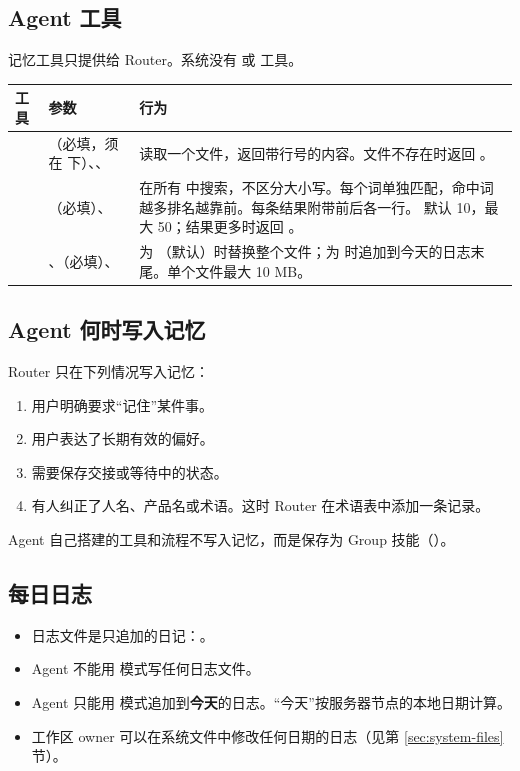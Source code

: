 \documentclass[UTF8,a4paper,11pt]{ctexart}
\begin{document}
\subsection{Agent 工具}

记忆工具只提供给 Router。系统没有  或  工具。

\begin{longtable}{P{3.0cm}P{4.2cm}P{6.6cm}}
\toprule
工具 & 参数 & 行为 \\
\midrule
\endhead
{} & （必填，须在  下）、、 & 读取一个文件，返回带行号的内容。文件不存在时返回 。 \\
 & （必填）、 & 在所有  中搜索，不区分大小写。每个词单独匹配，命中词越多排名越靠前。每条结果附带前后各一行。 默认 10，最大 50；结果更多时返回 。 \\
 & 、（必填）、 &  为 （默认）时替换整个文件；为  时追加到今天的日志末尾。单个文件最大 10 MB。 \\
\bottomrule
\end{longtable}

\subsection{Agent 何时写入记忆}

Router 只在下列情况写入记忆：

\begin{enumerate}
  \item 用户明确要求“记住”某件事。
  \item 用户表达了长期有效的偏好。
  \item 需要保存交接或等待中的状态。
  \item 有人纠正了人名、产品名或术语。这时 Router 在术语表中添加一条记录。
\end{enumerate}

Agent 自己搭建的工具和流程不写入记忆，而是保存为 Group 技能（）。

\subsection{每日日志}

\begin{itemize}
  \item 日志文件是只追加的日记：。
  \item Agent 不能用  模式写任何日志文件。
  \item Agent 只能用  模式追加到\textbf{今天}的日志。“今天”按服务器节点的本地日期计算。
  \item 工作区 owner 可以在系统文件中修改任何日期的日志（见第 \ref{sec:system-files} 节）。
\end{itemize}
\end{document}
